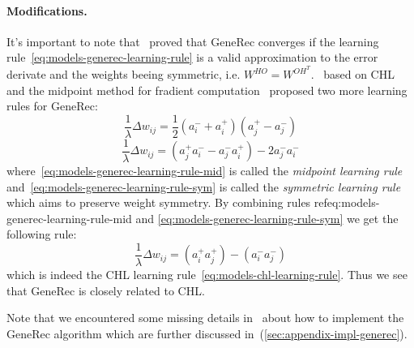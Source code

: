 \paragraph{Modifications.}
\label{sec:our-learning-rules}
\label{sec:models-generec-modifications} 
It's important to note that~\citet{o1996bio} proved that GeneRec converges if the learning rule~\ref{eq:models-generec-learning-rule} is a valid approximation to the error derivate and the weights beeing symmetric, i.e. $W^{HO} = W^{OH^{T}}$.~\citet{o1996bio} based on CHL and the midpoint method for fradient computation~\citep{press1990numerical} proposed two more learning rules for GeneRec: 
\begin{equation}
  \label{eq:models-generec-learning-rule-mid}
  \frac{1}{\lambda} \Delta w_{ij} =  \frac{1}{2}(a^{-}_i + a^{+}_i)(a^{+}_j - a^{-}_j)
\end{equation}
\begin{equation}
  \label{eq:models-generec-learning-rule-sym}
  \frac{1}{\lambda} \Delta w_{ij} =  (a^{+}_j a^{-}_i - a^{-}_j a^{+}_i) - 2a^{-}_j a^{-}_i
\end{equation}
where~\ref{eq:models-generec-learning-rule-mid} is called the \emph{midpoint learning rule} and~\ref{eq:models-generec-learning-rule-sym} is called the \emph{symmetric learning rule} which aims to preserve weight symmetry. By combining rules ref{eq:models-generec-learning-rule-mid} and \ref{eq:models-generec-learning-rule-sym} we get the following rule: 
\begin{equation}
  \label{eq:models-generec-learning-rule-chl}
  \frac{1}{\lambda} \Delta w_{ij} =  (a^{+}_i a^{+}_j) - (a^{-}_i a^{-}_j)
\end{equation}
which is indeed the CHL learning rule~\ref{eq:models-chl-learning-rule}. Thus we see that GeneRec is closely related to CHL. 

Note that we encountered some missing details in~\citet{o1996bio} about how to implement the GeneRec algorithm which are further discussed in~(\ref{sec:appendix-impl-generec}).
